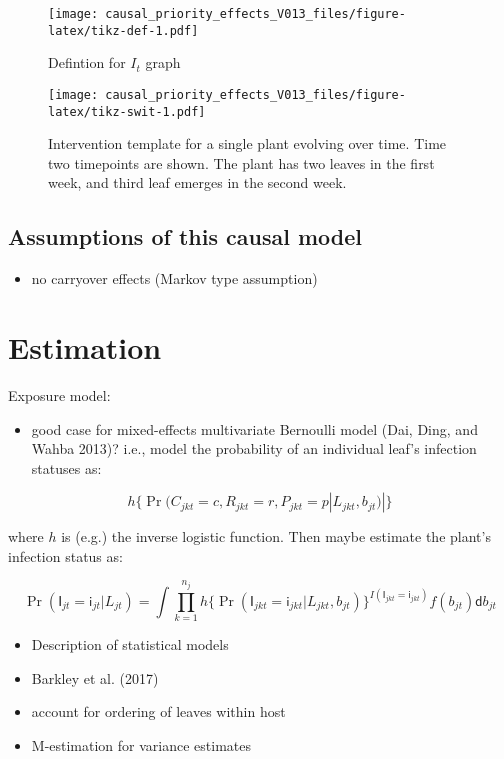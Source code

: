 \documentclass[]{article}
\providecommand{\tightlist}{%
  \setlength{\itemsep}{0pt}\setlength{\parskip}{0pt}}
\begin{document}
\begin{figure}
\centering
\texttt{[image: causal\_priority\_effects\_V013\_files/figure-latex/tikz-def-1.pdf]}
\caption{Defintion for \(I_t\) graph}
\end{figure}

\begin{figure}
\centering
\texttt{[image: causal\_priority\_effects\_V013\_files/figure-latex/tikz-swit-1.pdf]}
\caption{Intervention template for a single plant evolving over time.
Time two timepoints are shown. The plant has two leaves in the first
week, and third leaf emerges in the second week.}
\end{figure}

\subsection{Assumptions of this causal model}\label{causal_assumptions}

\begin{itemize}
\tightlist
\item
  no carryover effects (Markov type assumption)
\end{itemize}

\section{Estimation}\label{estimation}

Exposure model:

\begin{itemize}
\tightlist
\item
  good case for mixed-effects multivariate Bernoulli model (Dai, Ding,
  and Wahba 2013)? i.e., model the probability of an individual leaf's
  infection statuses as:
\end{itemize}

\[
h\{\Pr(C_{jkt} = c, R_{jkt}  = r, P_{jkt}  = p | L_{jkt}, b_{jt})|\}
\]

where \(h\) is (e.g.) the inverse logistic function. Then maybe estimate
the plant's infection status as:

\[
\Pr(\mathsf{I}_{jt} = \mathsf{i}_{jt} | L_{jt}) = \int \prod_{k = 1}^{n_j}h\{\Pr(\mathsf{I}_{jkt} = \mathsf{i}_{jkt}  | L_{jkt}, b_{jt})\}^{I(\mathsf{I}_{jkt} = \mathsf{i}_{jkt} )} f(b_{jt}) \mathsf{d}b_{jt}
\]

\begin{itemize}
\tightlist
\item
  Description of statistical models
\item
  Barkley et al. (2017)
\item
  account for ordering of leaves within host
\item
  M-estimation for variance estimates
\end{itemize}
\end{document}
